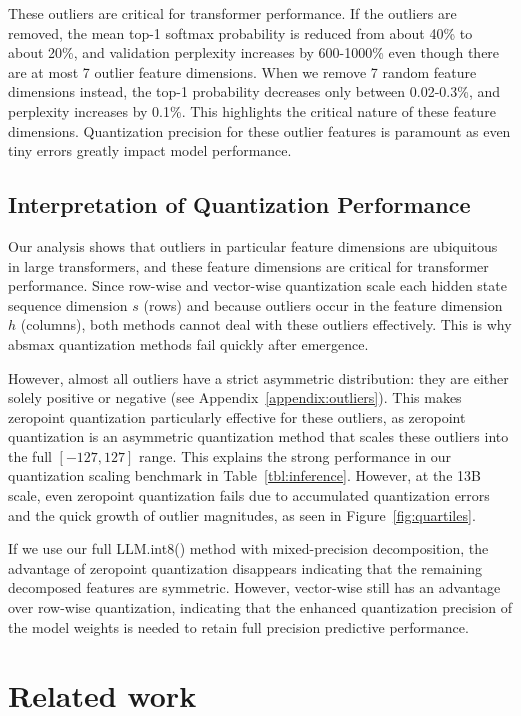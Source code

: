 \documentclass{article}
\begin{document}
These outliers are critical for transformer performance. If the outliers are removed, the mean top-1 softmax probability is reduced from about 40\% to about 20\%, and validation perplexity increases by 600-1000\% even though there are at most 7 outlier feature dimensions. When we remove 7 random feature dimensions instead, the top-1 probability decreases only between 0.02-0.3\%, and perplexity increases by 0.1\%. This highlights the critical nature of these feature dimensions. Quantization precision for these outlier features is paramount as even tiny errors greatly impact model performance.

\subsection{Interpretation of Quantization Performance}

Our analysis shows that outliers in particular feature dimensions are ubiquitous in large transformers, and these feature dimensions are critical for transformer performance.
Since row-wise and vector-wise quantization scale each hidden state sequence dimension $s$ (rows) and because outliers occur in the feature dimension $h$ (columns), both methods cannot deal with these outliers effectively. This is why absmax quantization methods fail quickly after emergence.

However, almost all outliers have a strict asymmetric distribution: they are either solely positive or negative (see Appendix~\ref{appendix:outliers}). This makes zeropoint quantization particularly effective for these outliers, as zeropoint quantization is an asymmetric quantization method that scales these outliers into the full $[-127, 127]$ range. This explains the strong performance in our quantization scaling benchmark in Table~\ref{tbl:inference}. However, at the 13B scale, even zeropoint quantization fails due to accumulated quantization errors and the quick growth of outlier magnitudes, as seen in Figure~\ref{fig:quartiles}.

If we use our full LLM.int8() method with mixed-precision decomposition, the advantage of zeropoint quantization disappears indicating that the remaining decomposed features are symmetric. However, vector-wise still has an advantage over row-wise quantization, indicating that the enhanced quantization precision of the model weights is needed to retain full precision predictive performance.

\section{Related work}
\vspace{-1em}
\end{document}
